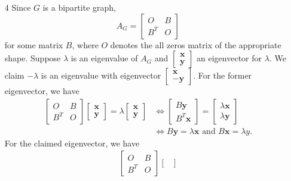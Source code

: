 \documentclass{article}
\newcommand{\1}{\mathbf{1}}
\newcommand{\0}{\mathbf{0}}
\begin{document}
\begin{enumerate}
\item[4]
  Since $G$ is a bipartite graph,
  \begin{equation*}
    A_G =
    \begin{bmatrix}
      O & B \\
      B^T & O
    \end{bmatrix}
  \end{equation*}
  for some matrix $B$, where $O$ denotes the all zeros matrix of the appropriate shape.
  Suppose $\lambda$ is an eigenvalue of $A_G$ and $\begin{bmatrix}\mathbf{x} \\ \mathbf{y}\end{bmatrix}$ an eigenvector for $\lambda$.
  We claim $-\lambda$ is an eigenvalue with eigenvector $\begin{bmatrix}\mathbf{x} \\ -\mathbf{y}\end{bmatrix}$.
  For the former eigenvector, we have
  \begin{align*}
    \begin{bmatrix}
      O & B \\
      B^T & O
    \end{bmatrix}
    \begin{bmatrix}
      \mathbf{x} \\ \mathbf{y}
    \end{bmatrix}
    =
    \lambda
    \begin{bmatrix}
      \mathbf{x} \\ \mathbf{y}
    \end{bmatrix}
    & \iff
    \begin{bmatrix}
      B \mathbf{y} \\
      B^T \mathbf{x}
    \end{bmatrix}
    =
    \begin{bmatrix}
      \lambda \mathbf{x} \\ \lambda \mathbf{y}
    \end{bmatrix}
    \\
    & \iff
    B \mathbf{y} = \lambda \mathbf{x} \text{ and } B \mathbf{x} = \lambda y.
  \end{align*}
  For the claimed eigenvector, we have
  \begin{align*}
    \begin{bmatrix}
      O & B \\
      B^T & O
    \end{bmatrix}
    \begin{bmatrix}

\end{bmatrix}
\end{align*}
\end{enumerate}
\end{document}
